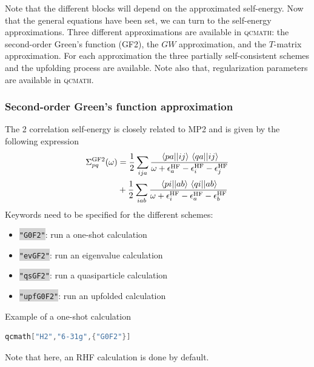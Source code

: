 \documentclass[aip,jcp,reprint,noshowkeys,superscriptaddress]{revtex4-1}
\newcommand{\GFtwo}{\text{GF}2}
\newcommand{\GF}{\text{GF}}
\newcommand{\HF}{\text{HF}}
\newcommand{\ep}{\epsilon}
\newcommand{\Sigm}{\Sigma}
\newcommand{\ERI}[2]{\mel{#1}{}{#2}}
\newcommand{\qcmath}{\textsc{qcmath}\xspace}
\newcommand{\keyword}[1]{{\colorbox{lightgray}{\texttt{#1}}}}
\begin{document}
Note that the different blocks will depend on the approximated self-energy. Now that the general equations have been set, we can turn to the self-energy approximations. Three different approximations are available in \qcmath: the second-order Green's function (GF2), the $GW$ approximation, and the $T$-matrix approximation. For each approximation the three partially self-consistent schemes and the upfolding process are available. Note also that, regularization parameters are available in \qcmath.
 
\subsubsection*{Second-order Green's function approximation}
The {\GFtwo} correlation self-energy is closely related to MP2 and is given by the following expression
\begin{equation}
\label{eq:SigCGF2}
\begin{split}
	\Sigm_{pq}^{\GF2}(\omega) 
	& = \frac{1}{2}\sum_{ija} \frac{\ERI{pa}{ij} \ERI{qa}{ij}}{\omega + \ep_{a}^{\HF} - \ep_{i}^{\HF} - \ep_{j}^{\HF}}
	\\
	& + \frac{1}{2}\sum_{iab} \frac{\ERI{pi}{ab} \ERI{qi}{ab}}{\omega + \ep_{i}^{\HF} - \ep_{a}^{\HF} - \ep_{b}^{\HF}}
\end{split}
\end{equation}
Keywords need to be specified for the different schemes: 
\begin{itemize}
\item \keyword{"G0F2"}: run a one-shot calculation
\item \keyword{"evGF2"}: run an eigenvalue calculation 
\item \keyword{"qsGF2"}: run a quasiparticle calculation 
\item \keyword{"upfG0F2"}: run an upfolded calculation
\end{itemize}

Example of a one-shot calculation
\begin{lstlisting}[extendedchars=true,language=Mathematica]
	qcmath["H2","6-31g",{"G0F2"}]
\end{lstlisting}
Note that here, an RHF calculation is done by default.

\end{document}
